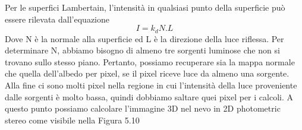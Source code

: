 \newline
Per le superfici Lambertain, l'intensità in qualsiasi punto della superficie può essere rilevata dall'equazione
\begin{equation}
		I=k_dN.L
\end{equation}
Dove N è la normale alla superficie ed L è la direzione della luce riflessa.
\newline
Per determinare N, abbiamo bisogno di almeno tre sorgenti luminose che non si trovano sullo stesso piano.
\newline
Pertanto, possiamo recuperare sia la mappa normale che quella dell'albedo per pixel, se il pixel riceve luce da almeno una sorgente.
\newline
Alla fine ci sono molti pixel nella regione in cui l'intensità della luce proveniente dalle sorgenti è molto bassa, quindi dobbiamo saltare quei pixel per i calcoli.
A questo punto possiamo calcolare l'immagine 3D nel nevo in 2D photometric stereo come visibile nella Figura 5.10
\newpage
